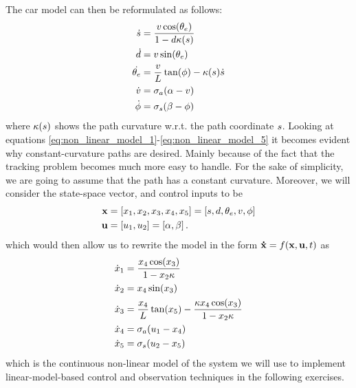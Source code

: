 	The car model can then be reformulated as follows:
	\begin{subequations}
	\begin{align}	
		\dot{s} 	& = \frac{v\cos(\theta_e)}{1-d\kappa(s)} \label{eq:non_linear_model_1}\\
		\dot{d}& = v\sin(\theta_e) \label{eq:non_linear_model_2}\\
		\dot{\theta_e}    & = \frac{v}{L}\tan(\phi) - \kappa(s)\dot{s} \label{eq:non_linear_model_3}\\
		\dot{v} & = \sigma_a(\alpha-v) \label{eq:non_linear_model_4}\\
		\dot{\phi} & = \sigma_s(\beta-\phi) \label{eq:non_linear_model_5}
	\end{align}
	\end{subequations}
	where $\kappa(s)$ shows the path curvature w.r.t. the path coordinate $s$.
	Looking at equations \ref{eq:non_linear_model_1}-\ref{eq:non_linear_model_5} it becomes evident why constant-curvature paths are desired. 
	Mainly because of the fact that the tracking problem becomes much more easy to handle.
	For the sake of simplicity, we are going to assume that the path has a constant curvature. %
	Moreover, we will consider the state-space vector, and control inputs to be 
	\begin{align}
		\mathbf{\state} & = \left[ \stat{1},\stat{2},\stat{3},\stat{4},\stat{5}\right] = %
							\left[\pathCoor, \distToPath, \yawErr, \speed, \steering\right] \label{eq:stateVector}\\ 
		\mathbf{\control} & = \left[ \con{1},\con{2} \right] = %
							  \left[ \alpha, \beta \right].
	\end{align}
	which would then allow us to rewrite the model in the form $ \mathbf{\dot{x}} = f(\mathbf{x},\mathbf{u},t) $ as
	\begin{align}
		\dot{x}_1 	& = \frac{x_4\cos(x_3)}{1-x_2\kappa} \label{eq:ss1}\\
		\dot{x}_2   & = x_4\sin(x_3) \label{eq:ss2}\\
		\dot{x}_3   & = \frac{x_4}{L}\tan(x_5) - \frac{\kappa x_4\cos(x_3)}{1-x_2\kappa} \label{eq:ss3}\\
		\dot{x}_4   & = \sigma_a(u_1-x_4)\label{eq:ss4}\\
		\dot{x}_5   & = \sigma_s(u_2-x_5) \label{eq:ss5}
	\end{align}
	which is the continuous non-linear model of the system we will use to implement linear-model-based control and observation techniques in the following exercises. 
		



